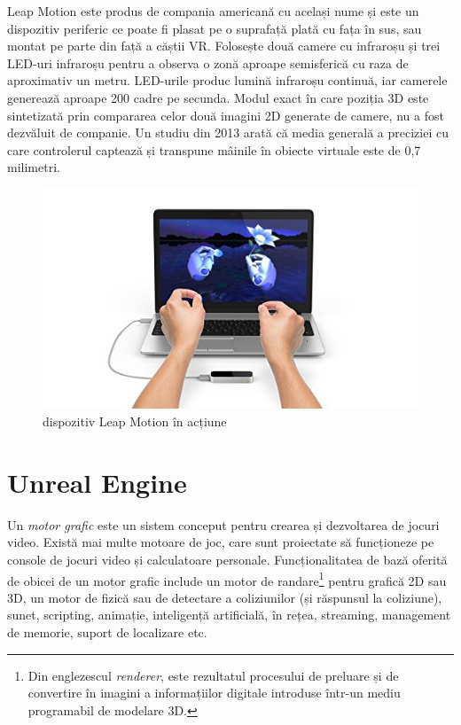 Leap Motion este produs de compania americană cu același nume și este un dispozitiv periferic ce poate fi plasat pe o suprafață plată cu fața în sus, sau montat pe parte din față a căștii VR. Folosește două camere cu infraroșu și trei LED-uri infraroșu pentru a observa o zonă aproape semisferică cu raza de aproximativ un metru. LED-urile produc lumină infraroșu continuă, iar camerele generează aproape 200 cadre pe secunda.
Modul exact în care poziția 3D este sintetizată prin compararea celor două imagini 2D generate de camere, nu a fost dezvăluit de companie. Un studiu din 2013 arată că media generală a preciziei cu care controlerul captează și transpune mâinile în obiecte virtuale este de 0,7 milimetri.

\begin{figure}[h]
  \centering
  \includegraphics[scale=0.4]{img/leapUse.jpg}
  \caption{dispozitiv Leap Motion în acțiune}
\end{figure}

\section{Unreal Engine}

Un \textit{motor grafic} este un sistem conceput pentru crearea și dezvoltarea de jocuri video. Există mai multe motoare de joc, care sunt proiectate să funcționeze pe console de jocuri video și calculatoare personale. Funcționalitatea de bază oferită de obicei de un motor grafic include un motor de randare\footnote{Din englezescul \textit{renderer}, este rezultatul procesului de preluare și de convertire în imagini a informațiilor digitale introduse într-un mediu programabil de modelare 3D.} pentru grafică 2D sau 3D, un motor de fizică sau de detectare a coliziunilor (și răspunsul la coliziune), sunet, scripting, animație, inteligență artificială, în rețea, streaming, management de memorie, suport de localizare etc. 

